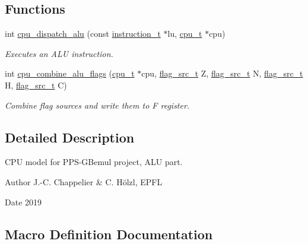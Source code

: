 \subsection*{Functions}
\begin{DoxyCompactItemize}
\item 
int \hyperlink{cpu-alu_8h_ab160349665b976fd9744ef060ec11b34}{cpu\+\_\+dispatch\+\_\+alu} (const \hyperlink{structinstruction__t}{instruction\+\_\+t} $\ast$lu, \hyperlink{structcpu__t}{cpu\+\_\+t} $\ast$cpu)
\begin{DoxyCompactList}\small\item\em Executes an A\+LU instruction. \end{DoxyCompactList}\item 
int \hyperlink{cpu-alu_8h_ac780d6a4222a48f38ef077b29ca9dca2}{cpu\+\_\+combine\+\_\+alu\+\_\+flags} (\hyperlink{structcpu__t}{cpu\+\_\+t} $\ast$cpu, \hyperlink{cpu-alu_8h_a4c967c3e85658e567133a3f087ad8da9}{flag\+\_\+src\+\_\+t} Z, \hyperlink{cpu-alu_8h_a4c967c3e85658e567133a3f087ad8da9}{flag\+\_\+src\+\_\+t} N, \hyperlink{cpu-alu_8h_a4c967c3e85658e567133a3f087ad8da9}{flag\+\_\+src\+\_\+t} H, \hyperlink{cpu-alu_8h_a4c967c3e85658e567133a3f087ad8da9}{flag\+\_\+src\+\_\+t} C)
\begin{DoxyCompactList}\small\item\em Combine flag sources and write them to F register. \end{DoxyCompactList}\end{DoxyCompactItemize}


\subsection{Detailed Description}
C\+PU model for P\+P\+S-\/\+G\+Bemul project, A\+LU part. 

\begin{DoxyAuthor}{Author}
J.-\/C. Chappelier \& C. Hölzl, E\+P\+FL 
\end{DoxyAuthor}
\begin{DoxyDate}{Date}
2019 
\end{DoxyDate}


\subsection{Macro Definition Documentation}
\mbox{\label{cpu-alu_8h_a23ade8162e2334e23894c4a1fb23c834}} 
